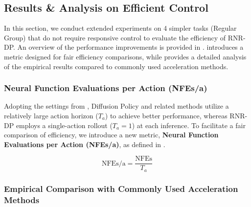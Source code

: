 


\subsection{Results \& Analysis on Efficient Control}

In this section, we conduct extended experiments on 4 simpler tasks (Regular Group) that do not require responsive control to evaluate the efficiency of RNR-DP. An overview of the performance improvements is provided in .  introduces a metric designed for fair efficiency comparisons, while  provides a detailed analysis of the empirical results compared to commonly used acceleration methods.

\label{sec:exp_speed_claim}

\subsubsection{Neural Function Evaluations per Action (NFEs/a)}
\label{sec:nfe_a}

Adopting the settings from \cite{chi2023diffusion}, Diffusion Policy and related methods utilize a relatively large action horizon (\( T_a \)) to achieve better performance, whereas RNR-DP employs a single-action rollout (\( T_a = 1 \)) at each inference. To facilitate a fair comparison of efficiency, we introduce a new metric, \textbf{Neural Function Evaluations per Action (NFEs/a)}, as defined in .

\begin{equation}
    \label{eq:nfe_per_action_definition}
    \mathrm{NFEs/a} = \frac{\mathrm{NFEs}}{T_a}
\end{equation}

\subsubsection{Empirical Comparison with Commonly Used Acceleration Methods}
\label{sec:empirical_speed}

